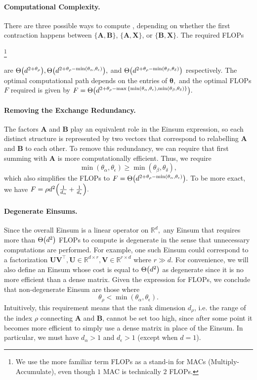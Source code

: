 \documentclass{article}
\newcounter{daggerfootnote}
\newcommand*{\daggerfootnote}[1]{
    \setcounter{daggerfootnote}{\value{footnote}}
    \renewcommand*{\thefootnote}{\fnsymbol{footnote}}
    \footnote[2]{#1}
    \setcounter{footnote}{\value{daggerfootnote}}
    \renewcommand*{\thefootnote}{\arabic{footnote}}
    }
\newcommand{\mbf}[1]{{\boldsymbol{\mathbf{#1}}}}
\newcommand{\bm}{\mbf}
\newcommand{\R}{\mathbb{R}}
\renewcommand{\order}[1]{\Theta\qty(#1)}
\begin{document}
\paragraph{Computational Complexity.}
There are three possible ways to compute , depending on whether the first contraction happens between $\{\bm{A}, \bm{B}\}$, $\{\bm{A}, \bm{X}\}$, or $\{\bm{B}, \bm{X}\}.$ The required FLOPs
\daggerfootnote{We use the more familiar term FLOPs as a stand-in for MACs (Multiply-Accumulate), even though $1$ MAC is technically $2$ FLOPs.}
 are $\order{d^{2 + \theta_\rho}}, \order{d^{2 + \theta_\rho - \min(\theta_\alpha, \theta_\epsilon)}},$ and $\order{d^{2 + \theta_\rho - \min(\theta_\beta, \theta_\delta)}}$ respectively. The optimal computational path depends on the entries of $\bm{\theta},$ and the optimal FLOPs $F$ required is given by $F=\order{d^{2 + \theta_\rho - \max\qty{\min(\theta_\alpha, \theta_\epsilon), \min(\theta_\beta, \theta_\delta)}}}.$

\paragraph{Removing the Exchange Redundancy.}
The factors $\bm{A}$ and $\bm{B}$ play an equivalent role in the Einsum expression, so each distinct structure is represented by two vectors that correspond to relabelling $\bm{A}$ and $\bm{B}$ to each other. To remove this redundancy, we can require that first summing with $\bm{A}$ is more computationally efficient. Thus, we require
\begin{equation}
    \min(\theta_\alpha, \theta_\epsilon) \geq \min(\theta_\beta, \theta_\delta),
\end{equation}
which also simplifies the FLOPs to $F = \order{d^{2 + \theta_\rho - \min(\theta_\alpha, \theta_\epsilon)}}.$
To be more exact, we have $F = \rho d^2 \qty(\frac{1}{d_{\alpha}} + \frac{1}{d_{\epsilon}}).$

\paragraph{Degenerate Einsums.}
Since the overall Einsum is a linear operator on $\R^d,$ any Einsum that requires more than $\order{d^2}$ FLOPs to compute is degenerate in the sense that unnecessary computations are performed. For example, one such Einsum could correspond to a factorization $\bm{U}\bm{V}^\intercal, \bm{U} \in \R^{d\times r}, \bm{V} \in \R^{r \times d}$ where $r \gg d.$ For convenience, we will also define an Einsum whose cost is equal to $\order{d^2}$ as degenerate since it is no more efficient than a dense matrix. Given the expression for FLOPs, we conclude that non-degenerate Einsum are those where
\begin{equation}
    \theta_\rho < \min(\theta_\alpha, \theta_\epsilon).
\end{equation}
Intuitively, this requirement means that the rank dimension $d_\rho$, i.e. the range of the index $\rho$ connecting $\bm{A}$ and $\bm{B}$, cannot be set too high, since after some point it becomes more efficient to simply use a dense matrix in place of the Einsum. In particular, we must have $d_\alpha > 1$ and $d_\epsilon > 1$ (except when $d = 1$).
\end{document}
